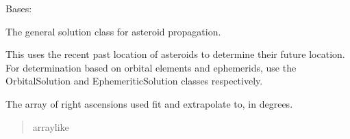\documentclass[letterpaper,11pt,english]{sphinxmanual}
\begin{document}
\begin{savenotes}\begin{fulllineitems}
\label{\detokenize{code/opihiexarata.propagate.solution:opihiexarata.propagate.solution.PropagativeSolution}}
\pysigstartsignatures
{}
\pysigstopsignatures
\sphinxAtStartPar
Bases: {\hyperref[\detokenize{code/opihiexarata.library.engine:opihiexarata.library.engine.ExarataSolution}]{}}

\sphinxAtStartPar
The general solution class for asteroid propagation.

\sphinxAtStartPar
This uses the recent past location of asteroids to determine their
future location. For determination based on orbital elements and
ephemerids, use the OrbitalSolution and EphemeriticSolution classes
respectively.

\begin{savenotes}\begin{fulllineitems}
\label{\detokenize{code/opihiexarata.propagate.solution:opihiexarata.propagate.solution.PropagativeSolution.ra_array}}
\pysigstartsignatures
{}
\pysigstopsignatures
\sphinxAtStartPar
The array of right ascensions used fit and extrapolate to,
in degrees.
\begin{quote}\begin{description}
\sphinxAtStartPar
array\sphinxhyphen{}like

\end{description}\end{quote}


\end{fulllineitems}
\end{savenotes}
\end{fulllineitems}
\end{savenotes}
\end{document}
